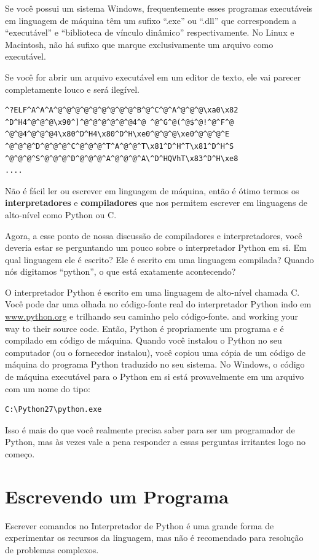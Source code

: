 Se você possui um sistema Windows, frequentemente esses programas executáveis em linguagem de máquina têm um sufixo ``.exe'' ou ``.dll'' que correspondem a ``executável'' e ``biblioteca de vínculo dinâmico'' respectivamente.  No Linux e Macintosh, não há sufixo que marque exclusivamente um arquivo como executável.

Se você for abrir um arquivo executável em um editor de texto, ele vai parecer completamente louco e será ilegível.


\begin{verbatim}
^?ELF^A^A^A^@^@^@^@^@^@^@^@^@^B^@^C^@^A^@^@^@\xa0\x82
^D^H4^@^@^@\x90^]^@^@^@^@^@^@4^@ ^@^G^@(^@$^@!^@^F^@
^@^@4^@^@^@4\x80^D^H4\x80^D^H\xe0^@^@^@\xe0^@^@^@^E
^@^@^@^D^@^@^@^C^@^@^@^T^A^@^@^T\x81^D^H^T\x81^D^H^S
^@^@^@^S^@^@^@^D^@^@^@^A^@^@^@^A\^D^HQVhT\x83^D^H\xe8
....
\end{verbatim}

%
Não é fácil ler ou escrever em linguagem de máquina, então é ótimo termos os 
{\bf interpretadores} e {\bf compiladores} que nos permitem escrever em linguagens de alto-nível como Python ou C.

Agora, a esse ponto de nossa discussão de compiladores e interpretadores, você deveria estar se perguntando um pouco sobre o interpretador Python em si. Em qual linguagem ele é escrito? Ele é escrito em uma linguagem compilada? Quando nós digitamos ``python'', o que está exatamente acontecendo?

O interpretador Python é escrito em uma linguagem de alto-nível chamada C. Você pode dar uma olhada no código-fonte real do interpretador Python indo em \url{www.python.org} e trilhando seu caminho pelo código-fonte. and working your way to their source code.
Então, Python é propriamente um programa e é compilado em código de máquina.
Quando você instalou o Python no seu computador (ou o fornecedor instalou), você copiou uma cópia de um código de máquina do programa Python traduzido no seu sistema.   No Windows, o código de máquina executável para o Python em si está provavelmente em um arquivo com um nome do tipo:


\begin{verbatim}
C:\Python27\python.exe
\end{verbatim}

%
Isso é mais do que você realmente precisa saber para ser um programador de Python, mas às vezes vale a pena responder a essas perguntas irritantes logo no começo.

\section{Escrevendo um Programa}%
Escrever comandos no Interpretador de Python é uma grande forma de experimentar os recursos da linguagem, mas não é recomendado para resolução de problemas complexos. 

